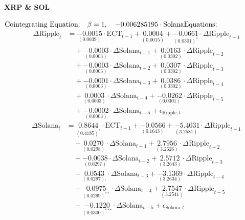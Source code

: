 %
\begin{center}
    \textbf{XRP \& SOL}
\end{center}
$\text{Cointegrating Equation:} \quad  \beta = 1, \quad -0.006285195 \cdot \text{Solana}\\
\text{Equations:} $
\begin{align*}
 \quad
\Delta \text{Ripple}_t &= 
\underset{(0.0039)}{-0.0015} \cdot \text{ECT}_{t-1} + 
\underset{(0.0015)}{0.0004} + 
\underset{(0.0301)^*}{-0.0661} \cdot \Delta \text{Ripple}_{t-1} \\
&\quad + \underset{(0.0003)}{-0.0003} \cdot \Delta \text{Solana}_{t-1} + 
\underset{(0.0302)}{0.0163} \cdot \Delta \text{Ripple}_{t-2} \\
&\quad + \underset{(0.0003)}{-0.0003} \cdot \Delta \text{Solana}_{t-2} + 
\underset{(0.0302)}{0.0307} \cdot \Delta \text{Ripple}_{t-3} \\
&\quad + \underset{(0.0003)}{-0.0001} \cdot \Delta \text{Solana}_{t-3} + 
\underset{(0.0302)}{0.0386} \cdot \Delta \text{Ripple}_{t-4} \\
&\quad + \underset{(0.0003)}{0.0003} \cdot \Delta \text{Solana}_{t-4} + 
\underset{(0.0301)}{-0.0262} \cdot \Delta \text{Ripple}_{t-5} \\
&\quad + \underset{(0.0003)}{-0.0002} \cdot \Delta \text{Solana}_{t-5} + \epsilon_{\text{Ripple},t}
\end{align*}
\begin{align*}
 \quad
\Delta \text{Solana}_t &= 
\underset{(0.4185)^*}{0.8644} \cdot \text{ECT}_{t-1} + 
\underset{(0.1643)}{-0.0566} + 
\underset{(3.2581).}{-5.4031} \cdot \Delta \text{Ripple}_{t-1} \\
&\quad + \underset{(0.0298)}{0.0270} \cdot \Delta \text{Solana}_{t-1} + 
\underset{(3.2626)}{2.7956} \cdot \Delta \text{Ripple}_{t-2} \\
&\quad + \underset{(0.0297)}{-0.0038} \cdot \Delta \text{Solana}_{t-2} + 
\underset{(3.2643)}{2.5712} \cdot \Delta \text{Ripple}_{t-3} \\
&\quad + \underset{(0.0297).}{0.0543} \cdot \Delta \text{Solana}_{t-3} + 
\underset{(3.2634)}{-3.1369} \cdot \Delta \text{Ripple}_{t-4} \\
&\quad + \underset{(0.0299)^{**}}{0.0975} \cdot \Delta \text{Solana}_{t-4} + 
\underset{(3.2541)}{2.7547} \cdot \Delta \text{Ripple}_{t-5} \\
&\quad + \underset{(0.0300)^{***}}{-0.1220} \cdot \Delta \text{Solana}_{t-5} + \epsilon_{\text{Solana},t}
\end{align*}







